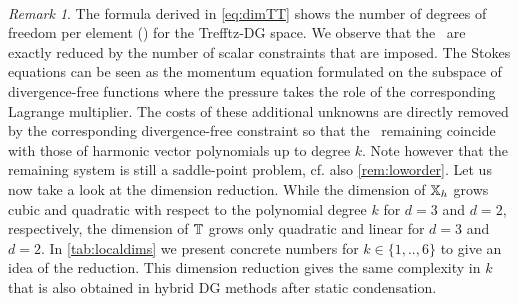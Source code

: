 \documentclass[pdflatex,sn-mathphys,Numbered]{sn-jnl}%
\theoremstyle{remark}%
\newtheorem{remark}{Remark}%
\theoremstyle{definition}%
\begin{document}
~
\begin{remark}
  The formula derived in \eqref{eq:dimTT} shows the number of degrees
  of freedom per element (\ndofs) for the Trefftz-DG space. We observe
  that the \ndofs ~are exactly reduced by the number of scalar
  constraints that are imposed. The Stokes equations can be seen as
  the momentum equation formulated on the subspace of divergence-free
  functions where the pressure takes the role of the corresponding
  Lagrange multiplier. The costs of these additional unknowns are
  directly removed by the corresponding divergence-free constraint so
  that the \ndofs ~remaining coincide with those of harmonic vector
  polynomials up to degree $k$. Note however that the remaining system
  is still a saddle-point problem, cf. also \cref{rem:loworder}. Let
  us now take a look at the dimension reduction. While the dimension
  of $\mathbb{X}_h$ grows cubic and quadratic with respect to the polynomial
  degree $k$ for $d=3$ and $d=2$, respectively, the dimension of $\mathbb{T}$
  grows only quadratic and linear for $d=3$ and $d=2$. In
  \cref{tab:localdims} we present concrete numbers for $k \in
  \{1,..,6\}$ to give an idea of the reduction. This dimension
  reduction gives the same complexity in $k$ that is also obtained in
  hybrid DG methods after static condensation.
\end{remark}
\end{document}
